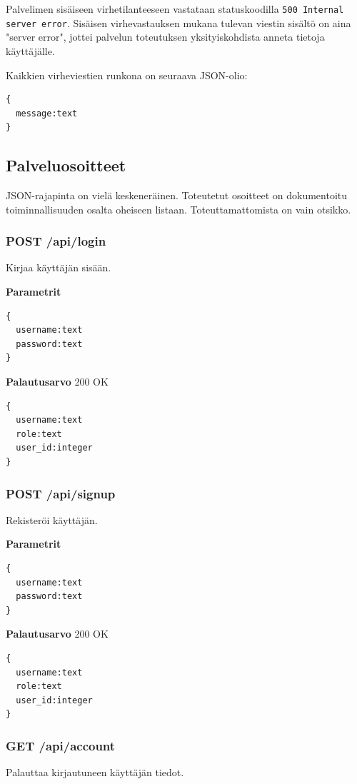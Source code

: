 \documentclass[a4paper,parskip=half]{scrartcl}
\begin{document}
Palvelimen sisäiseen virhetilanteeseen vastataan statuskoodilla \texttt{500
Internal server error}. Sisäisen virhevastauksen mukana tulevan viestin sisältö
on aina "server error", jottei palvelun toteutuksen yksityiskohdista anneta
tietoja käyttäjälle.

Kaikkien virheviestien runkona on seuraava JSON-olio:
\begin{Verbatim}
{
  message:text
}
\end{Verbatim}

\subsection{Palveluosoitteet}

JSON-rajapinta on vielä keskeneräinen. Toteutetut osoitteet on dokumentoitu
toiminnallisuuden osalta oheiseen listaan. Toteuttamattomista on vain otsikko.

\subsubsection{POST /api/login}
Kirjaa käyttäjän sisään.

\textbf{Parametrit}
\begin{Verbatim}
{
  username:text
  password:text
}
\end{Verbatim}

\textbf{Palautusarvo}
200 OK
\begin{Verbatim}
{
  username:text
  role:text
  user_id:integer
}
\end{Verbatim}

\subsubsection{POST /api/signup}
Rekisteröi käyttäjän.

\textbf{Parametrit}
\begin{Verbatim}
{
  username:text
  password:text
}
\end{Verbatim}

\textbf{Palautusarvo}
200 OK
\begin{Verbatim}
{
  username:text
  role:text
  user_id:integer
}
\end{Verbatim}

\subsubsection{GET /api/account}
Palauttaa kirjautuneen käyttäjän tiedot.
\end{document}
